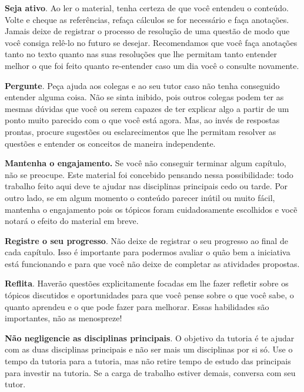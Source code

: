 \documentclass[10pt,openany,twoside=semi]{book}
\theoremstyle{estiloQuestao}
\theoremstyle{estiloQuestao}
\theoremstyle{estiloQuestao}
\theoremstyle{plain}
\theoremstyle{estiloSetinha}
\theoremstyle{estiloSetinha}
\theoremstyle{estiloSetinha}
\theoremstyle{estiloSetinha}
\newcommand{\notaTutor}[1]{ }
\newcommand{\notaTutor}[1]{
 	\hspace{0pt}\marginpar{
 		\scriptsize
 		\linespread{1.654} 
 		\ArchivoMediumEight
 		#1}}
\begin{document}
\notaTutor{Mas, ao invés de respostas prontas, procure sugestões ou esclarecimentos que lhe permitam resolver as questões e entender os conceitos de maneira independente.} \textbf{Seja ativo}. Ao ler o material, tenha certeza de que você entendeu o conteúdo. Volte e cheque as referências, refaça cálculos se for necessário e faça anotações. Jamais deixe de registrar o processo de resolução de uma questão de modo que você consiga relê-lo no futuro se desejar. Recomendamos que você faça anotações tanto no texto quanto nas suas resoluções que lhe permitam tanto entender  melhor o que foi feito quanto re-entender caso um dia você o consulte novamente. 

\textbf{Pergunte}. Peça ajuda aos colegas e ao seu tutor caso não tenha conseguido entender alguma coisa. Não se sinta inibido, pois outros colegas podem ter as mesmas dúvidas que você ou serem capazes de ter explicar algo a partir de um ponto muito parecido com o que você está agora. Mas, ao invés de respostas prontas, procure sugestões ou esclarecimentos que lhe permitam resolver as questões e entender os conceitos de maneira independente.

\textbf{Mantenha o engajamento.} Se você não conseguir terminar algum capítulo, não se preocupe. Este material foi concebido pensando nessa possibilidade: todo trabalho feito aqui deve te ajudar nas disciplinas principais cedo ou tarde. Por outro lado, se em algum momento o conteúdo parecer inútil ou muito fácil, mantenha o engajamento pois os tópicos foram cuidadosamente escolhidos e vocẽ notará o efeito do material em breve.

\textbf{Registre o seu progresso}. Não deixe de registrar o seu progresso ao final de cada capítulo. Isso é importante para podermos avaliar o quão bem a iniciativa está funcionando e para que você não deixe de completar as atividades propostas.

\textbf{Reflita}. Haverão questões explicitamente focadas em lhe fazer refletir sobre os tópicos discutidos e oportunidades para que você pense sobre o que você sabe, o quanto aprendeu e o que pode fazer para melhorar. Essas habilidades são importantes, não as menospreze! 

\textbf{Não negligencie as disciplinas principais}. O objetivo da tutoria é te ajudar com as duas disciplinas principais e não ser mais um disciplinas por si só. Use o tempo da tutoria para a tutoria, mas não retire tempo de estudo das principais para investir na tutoria. Se a carga de trabalho estiver demais, conversa com seu tutor.
\end{document}
